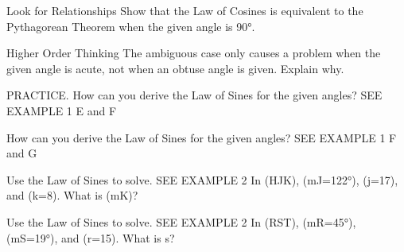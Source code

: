 \documentclass{article}
\newenvironment{practice}[2]{}{}        %
\newcommand{\answer}[1]{}               %
\newcommand{\placeholder}[2]{}          %
\newcommand{\te}[1]{}                   %
\begin{document}
\begin{practice}{16}{2}
Look for Relationships Show that the Law of Cosines is equivalent to the Pythagorean Theorem when the given angle is 90°.
\placeholder{diagram}{Black right triangle with horizontal bottom leg red b, vertical left leg red a, descending hypotenuse red c; lower left C with red right-angle square.}
\answer{(c^2=a^2+b^2-2ab(\cos90)); (c^2=a^2+b^2-2ab(0)); (c^2=a^2+b^2-0); (c^2=a^2+b^2). This is the Pythagorean Theorem.}
\end{practice}
\begin{practice}{17}{2}
Higher Order Thinking The ambiguous case only causes a problem when the given angle is acute, not when an obtuse angle is given. Explain why.
\answer{Inverse sine gives an acute angle, and the supplement to that angle will always be obtuse. This causes a problem when the known angle is acute because both the acute angle and its obtuse supplement could be valid options for the missing angle. However, if the known angle is obtuse, only the acute solution is valid because a triangle cannot contain two obtuse angles.}
\end{practice}
\begin{practice}{18}{2}
PRACTICE. How can you derive the Law of Sines for the given angles? SEE EXAMPLE 1
E and F
\placeholder{diagram}{Black obtuse triangle EFG, E upper left, F below and slightly right, G far right at same height as F; horizontal FG.}
\answer{Draw the altitude from G, label its length x. (\sin E=\frac xf) and (\sin F=\frac xe); (f\sin E=x) and (e\sin F=x); (f\sin E=e\sin F); (\frac{\sin E}{e}=\frac{\sin F}{f}).}
\end{practice}
\begin{practice}{19}{2}
How can you derive the Law of Sines for the given angles? SEE EXAMPLE 1
F and G
\te{Uses the triangle shown with Exercise 18.}
\answer{Draw the altitude from E, label its length x. (\sin F=\frac xg) and (\sin G=\frac xf); (g\sin F=x) and (f\sin G=x); (g\sin F=f\sin G); (\frac{\sin F}{f}=\frac{\sin G}{g}).}
\te{Printed proof keys for 18 and 19 omit the supplementary-angle step needed for obtuse F; likely use sin(180°-F)=sin F.}
\end{practice}
\begin{practice}{20}{1}
Use the Law of Sines to solve. SEE EXAMPLE 2
In (\triangle HJK), (m\angle J=122°), (j=17), and (k=8). What is (m\angle K)?
\answer{about 23.5°}
\end{practice}
\begin{practice}{21}{1}
Use the Law of Sines to solve. SEE EXAMPLE 2
In (\triangle RST), (m\angle R=45°), (m\angle S=19°), and (r=15). What is s?
\answer{about 6.9}
\end{practice}
\end{document}
